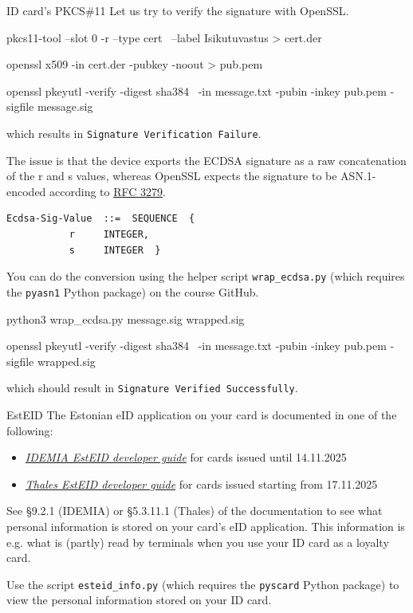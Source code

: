 \documentclass{practice}
\begin{document}
\begin{task}{ID card's PKCS\#11}
  Let us try to verify the signature with OpenSSL.
  \begin{cmdblock}
pkcs11-tool --slot 0 -r --type cert \
  --label Isikutuvastus > cert.der

openssl x509 -in cert.der -pubkey -noout > pub.pem

openssl pkeyutl -verify -digest sha384 \
  -in message.txt -pubin -inkey pub.pem -sigfile message.sig
  \end{cmdblock}
  which results in \texttt{Signature Verification Failure}.

  The issue is that the device exports the ECDSA signature as a raw concatenation of the r and s values, whereas OpenSSL expects the signature to be ASN.1-encoded according to \href{https://datatracker.ietf.org/doc/html/rfc3279#section-2.2.3}{RFC 3279}.
  \begin{Verbatim}
Ecdsa-Sig-Value  ::=  SEQUENCE  {
           r     INTEGER,
           s     INTEGER  }
  \end{Verbatim}

  You can do the conversion using the helper script \texttt{wrap\_ecdsa.py} (which requires the \texttt{pyasn1} Python package) on the course GitHub.
  \begin{cmdblock}
python3 wrap_ecdsa.py message.sig wrapped.sig

openssl pkeyutl -verify -digest sha384 \
  -in message.txt -pubin -inkey pub.pem -sigfile wrapped.sig
  \end{cmdblock}
  which should result in \texttt{Signature Verified Successfully}.
\end{task}

\begin{task}{EstEID}
  The Estonian eID application on your card is documented in one of the following:
  \begin{itemize}
    \item \href{https://www.id.ee/wp-content/uploads/2026/03/id1developerguide2025.pdf}{\textit{IDEMIA EstEID developer guide}} for cards issued until 14.11.2025
    \item \href{https://www.id.ee/wp-content/uploads/2025/11/ged24035_015_tdc_est_eid_developer_guide.pdf}{\textit{Thales EstEID developer guide}} for cards issued starting from 17.11.2025
  \end{itemize}

  See \S 9.2.1 (IDEMIA) or \S 5.3.11.1 (Thales) of the documentation to see what personal information is stored on your card's eID application.
  This information is e.g. what is (partly) read by terminals when you use your ID card as a loyalty card.

  Use the script \texttt{esteid\_info.py} (which requires the \texttt{pyscard} Python package) to view the personal information stored on your ID card.
\end{task}
\end{document}
